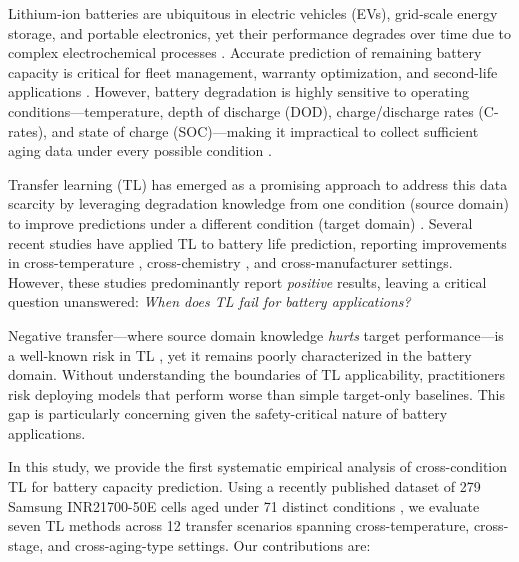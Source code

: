 \documentclass[review]{elsarticle}
\begin{document}
Lithium-ion batteries are ubiquitous in electric vehicles (EVs), grid-scale energy storage, and portable electronics, yet their performance degrades over time due to complex electrochemical processes \cite{severson2019data}. Accurate prediction of remaining battery capacity is critical for fleet management, warranty optimization, and second-life applications \cite{birkl2017degradation}. However, battery degradation is highly sensitive to operating conditions---temperature, depth of discharge (DOD), charge/discharge rates (C-rates), and state of charge (SOC)---making it impractical to collect sufficient aging data under every possible condition \cite{stroebl2024multistage}.

Transfer learning (TL) has emerged as a promising approach to address this data scarcity by leveraging degradation knowledge from one condition (source domain) to improve predictions under a different condition (target domain) \cite{pan2010survey}. Several recent studies have applied TL to battery life prediction, reporting improvements in cross-temperature \cite{ye2021cross}, cross-chemistry \cite{ma2022transfer}, and cross-manufacturer \cite{li2023transferable} settings. However, these studies predominantly report \textit{positive} results, leaving a critical question unanswered: \textit{When does TL fail for battery applications?}

Negative transfer---where source domain knowledge \textit{hurts} target performance---is a well-known risk in TL \cite{wang2019characterizing}, yet it remains poorly characterized in the battery domain. Without understanding the boundaries of TL applicability, practitioners risk deploying models that perform worse than simple target-only baselines. This gap is particularly concerning given the safety-critical nature of battery applications.

In this study, we provide the first systematic empirical analysis of cross-condition TL for battery capacity prediction. Using a recently published dataset of 279 Samsung INR21700-50E cells aged under 71 distinct conditions \cite{stroebl2024multistage}, we evaluate seven TL methods across 12 transfer scenarios spanning cross-temperature, cross-stage, and cross-aging-type settings. Our contributions are:
\end{document}
